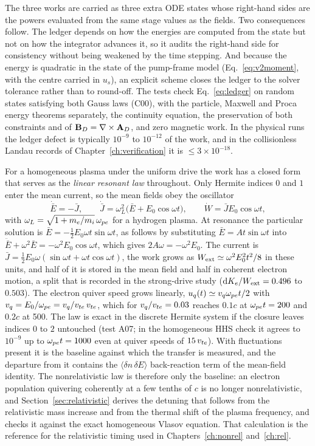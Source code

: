 The three works are carried as three extra ODE states whose right-hand sides are the powers evaluated from the same stage values as the fields. Two consequences follow. The ledger depends on how the energies are computed from the state but not on how the integrator advances it, so it audits the right-hand side for consistency without being weakened by the time stepping. And because the energy is quadratic in the state of the pump-frame model (Eq.~\eqref{eq:v2moment}, with the centre carried in $u_s$), an explicit scheme closes the ledger to the solver tolerance rather than to round-off. The tests check Eq.~\eqref{eq:ledger} on random states satisfying both Gauss laws (C00), with the particle, Maxwell and Proca energy theorems separately, the continuity equation, the preservation of both constraints and of $\mathbf{B}_D=\nabla\times\mathbf{A}_D$, and zero magnetic work. In the physical runs the ledger defect is typically $10^{-9}$ to $10^{-12}$ of the work, and in the collisionless Landau records of Chapter~\ref{ch:verification} it is $\le3\times10^{-18}$.

For a homogeneous plasma under the uniform drive the work has a closed form that serves as the \emph{linear resonant law} throughout. Only Hermite indices $0$ and $1$ enter the mean current, so the mean fields obey the oscillator
\begin{equation}
\dot{\bar E}=-\bar J,\qquad \dot{\bar J}=\omega_L^2\big(\bar E+E_0\cos\omega t\big),\qquad \dot W=\bar JE_0\cos\omega t ,
\label{eq:linlaw}
\end{equation}
with $\omega_L=\sqrt{1+m_e/m_i}\,\omega_{pe}$ for a hydrogen plasma. At resonance the particular solution is $\bar E=-\tfrac12E_0\omega t\sin\omega t$, as follows by substituting $\bar E=At\sin\omega t$ into $\ddot{\bar E}+\omega^2\bar E=-\omega^2E_0\cos\omega t$, which gives $2A\omega=-\omega^2E_0$. The current is $\bar J=\tfrac12E_0\omega(\sin\omega t+\omega t\cos\omega t)$, the work grows as $W_{\rm ext}\simeq\omega^2E_0^2t^2/8$ in these units, and half of it is stored in the mean field and half in coherent electron motion, a split that is recorded in the strong-drive study ($\mathrm d K_e/W_{\rm ext}=0.496$ to $0.503$). The electron quiver speed grows linearly, $u_q(t)\simeq v_q\omega_{pe} t/2$ with $v_q=E_0/\omega_{pe}=v_q/v_{te}\,v_{te}$, which for $v_q/v_{te}=0.03$ reaches $0.1c$ at $\omega_{pe} t=200$ and $0.2c$ at 500. The law is exact in the discrete Hermite system if the closure leaves indices $0$ to $2$ untouched (test A07; in the homogeneous HHS check it agrees to $10^{-9}$ up to $\omega_{pe} t=1000$ even at quiver speeds of $15\,v_{te}$). With fluctuations present it is the baseline against which the transfer is measured, and the departure from it contains the $\langle\delta n\,\delta E\rangle$ back-reaction term of the mean-field identity. The nonrelativistic law is therefore only the baseline: an electron population quivering coherently at a few tenths of $c$ is no longer nonrelativistic, and Section~\ref{sec:relativistic} derives the detuning that follows from the relativistic mass increase and from the thermal shift of the plasma frequency, and checks it against the exact homogeneous Vlasov equation. That calculation is the reference for the relativistic timing used in Chapters~\ref{ch:nonrel} and~\ref{ch:rel}.

